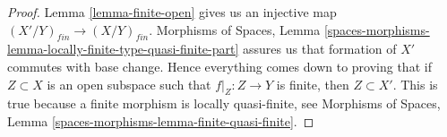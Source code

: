 \documentclass{stacks-project}
\theoremstyle{plain}
\theoremstyle{definition}
\theoremstyle{remark}
\numberwithin{equation}{subsection}
\begin{document}
\begin{proof}
Lemma \ref{lemma-finite-open}
gives us an injective map $(X'/Y)_{fin} \to (X/Y)_{fin}$.
Morphisms of Spaces,
Lemma \ref{spaces-morphisms-lemma-locally-finite-type-quasi-finite-part}
assures us that formation of $X'$ commutes with base change.
Hence everything comes down to proving that if
$Z \subset X$ is an open subspace such that $f|_Z : Z \to Y$ is finite,
then $Z \subset X'$. This is true because a finite morphism
is locally quasi-finite, see
Morphisms of Spaces, Lemma \ref{spaces-morphisms-lemma-finite-quasi-finite}.
\end{proof}
\end{document}
